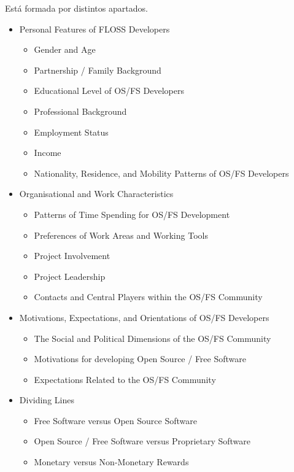 \documentclass[11pt]{article}
\begin{document}
\par Est\'a formada por distintos apartados.
\begin{itemize}

	\item Personal Features of FLOSS Developers
        \begin{itemize}
	        \item Gender and Age
	        \item Partnership / Family Background
	        \item Educational Level of OS/FS Developers
	        \item Professional Background
	        \item Employment Status
	        \item Income
	        \item Nationality, Residence, and Mobility Patterns of OS/FS Developers
        \end{itemize}

	\item Organisational and Work Characteristics
        \begin{itemize}
	        \item Patterns of Time Spending for OS/FS Development
	        \item Preferences of Work Areas and Working Tools
	        \item Project Involvement
	        \item Project Leadership
	        \item Contacts and Central Players within the OS/FS Community
        \end{itemize}

	\item Motivations, Expectations, and Orientations of OS/FS Developers
        \begin{itemize}
	        \item The Social and Political Dimensions of the OS/FS Community
	        \item Motivations for developing Open Source / Free Software
	        \item Expectations Related to the OS/FS Community
        \end{itemize}
    
    \item Dividing Lines
        \begin{itemize}
	        \item Free Software versus Open Source Software
	        \item Open Source / Free Software versus Proprietary Software
	        \item Monetary versus Non-Monetary Rewards
        \end{itemize}

\end{itemize}
\end{document}
